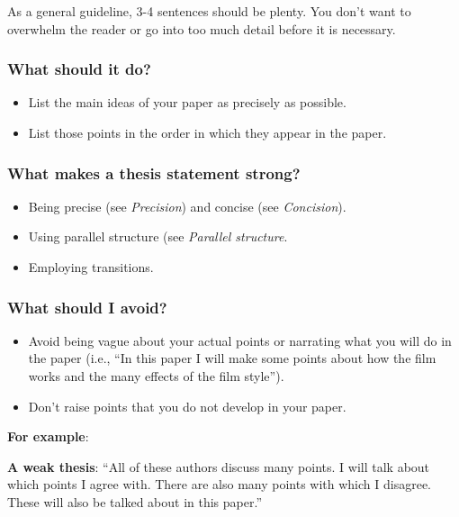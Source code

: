 As a general guideline, 3-4 sentences should be plenty. You don't want to overwhelm the reader or go into too much detail before it is necessary.

\subsubsection{What should it do?}

\begin{itemize}
\item List the main ideas of your paper as precisely as possible.

\item List those points in the order in which they appear in the paper.

\end{itemize}

\subsubsection{What makes a thesis statement strong?}

\begin{itemize}
\item Being precise (see \emph{Precision}) and concise (see \emph{Concision}).

\item Using parallel structure (see \emph{Parallel structure}.

\item Employing transitions.
\end{itemize}

\subsubsection{What should I avoid?}

\begin{itemize}
\item Avoid being vague about your actual points or narrating what you will do in the paper (i.e., ``In this paper I will make some points about how the film works and the many effects of the film style'').

\item Don't raise points that you do not develop in your paper.

\end{itemize}

\textbf{For example}:

\textbf{A weak thesis}:  “All of these authors discuss many points. I will talk about which points I agree with. There are also many points with which I disagree. These will also be talked about in this paper.”


